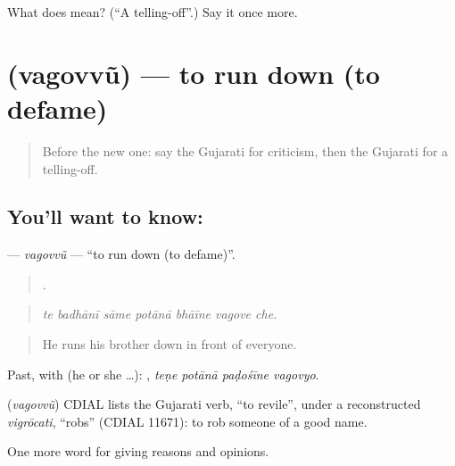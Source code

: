 \begin{tcolorbox}[breakable,colback=teal!4,colframe=teal!35!black,title={Before you move on}]
What does  mean? (\textquotedblleft{}A telling-off\textquotedblright{}.) Say it once more.
\end{tcolorbox}
\section[\texorpdfstring{\gu{વગોવવું} (vagovvũ)}{વગોવવું (vagovvũ)}]{ (vagovvũ) — to run down (to defame)}

\label{lesson:GU-C361-vagovvu}



\begin{quote}
Before the new one: say the Gujarati for criticism, then the Gujarati for a telling-off.
\end{quote}

\subsection*{You'll want to know: }
\textbf{} — \emph{vagovvũ} — \textquotedblleft{}to run down (to defame)\textquotedblright{}.

\begin{quote}
      .
\end{quote}

\begin{quote}
\emph{te badhānī sāme potānā bhāīne vagove che.}
\end{quote}

\begin{quote}
He runs his brother down in front of everyone.
\end{quote}

Past, with  (he or she …):    , \emph{teṇe potānā paḍośīne vagovyo}.

\begin{cousinweb}
\textbf{} (\emph{vagovvũ}) CDIAL lists the Gujarati verb, \textquotedblleft{}to revile\textquotedblright{}, under a reconstructed \emph{vigrōcati}, \textquotedblleft{}robs\textquotedblright{} (CDIAL 11671): to rob someone of a good name.
\end{cousinweb}

\begin{grammarlens}[title={What you've built}]
One more word for giving reasons and opinions.
\end{grammarlens}

